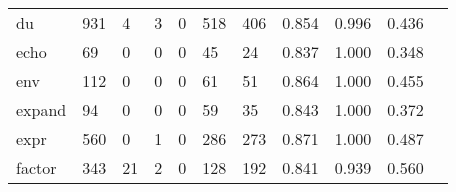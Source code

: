 \begin{longtable}{lp{1.2cm}p{1.2cm}p{1.2cm}p{1.2cm}p{1.2cm}p{1.2cm}p{1.2cm}p{1.2cm}p{1.2cm}p{1.2cm}}
du        &                                   931 &                                                  4 &                                                  3 &                                                  0 &                                                518 &                                                406 &                                              0.854 &                                              0.996 &                                              0.436 \\
echo      &                                    69 &                                                  0 &                                                  0 &                                                  0 &                                                 45 &                                                 24 &                                              0.837 &                                              1.000 &                                              0.348 \\
env       &                                   112 &                                                  0 &                                                  0 &                                                  0 &                                                 61 &                                                 51 &                                              0.864 &                                              1.000 &                                              0.455 \\
expand    &                                    94 &                                                  0 &                                                  0 &                                                  0 &                                                 59 &                                                 35 &                                              0.843 &                                              1.000 &                                              0.372 \\
expr      &                                   560 &                                                  0 &                                                  1 &                                                  0 &                                                286 &                                                273 &                                              0.871 &                                              1.000 &                                              0.487 \\
factor    &                                   343 &                                                 21 &                                                  2 &                                                  0 &                                                128 &                                                192 &                                              0.841 &                                              0.939 &                                              0.560 \\

\end{longtable}
